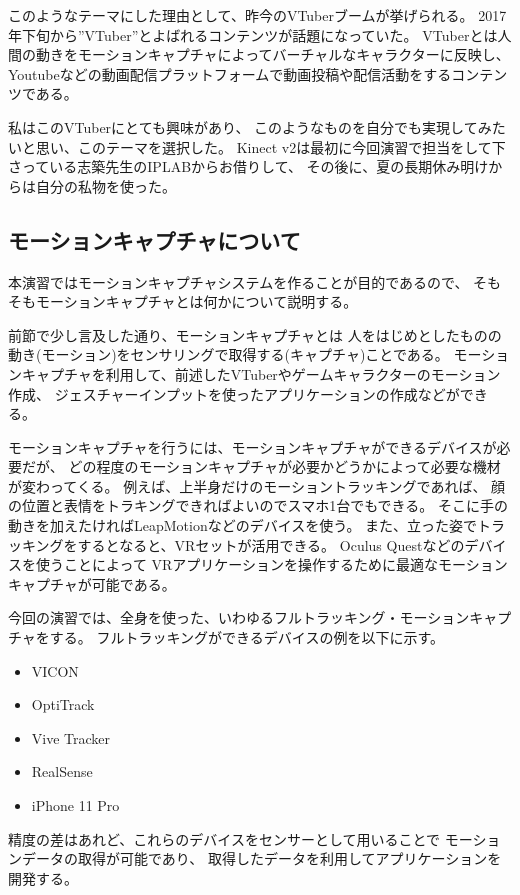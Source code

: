 \documentclass[a4j]{jsarticle}
\begin{document}
このようなテーマにした理由として、昨今のVTuberブームが挙げられる。
2017年下旬から”VTuber”とよばれるコンテンツが話題になっていた。
VTuberとは人間の動きをモーションキャプチャによってバーチャルなキャラクターに反映し、
Youtubeなどの動画配信プラットフォームで動画投稿や配信活動をするコンテンツである。

私はこのVTuberにとても興味があり、
このようなものを自分でも実現してみたいと思い、このテーマを選択した。
Kinect v2は最初に今回演習で担当をして下さっている志築先生のIPLABからお借りして、
その後に、夏の長期休み明けからは自分の私物を使った。

\subsection{モーションキャプチャについて}

本演習ではモーションキャプチャシステムを作ることが目的であるので、
そもそもモーションキャプチャとは何かについて説明する。

前節で少し言及した通り、モーションキャプチャとは
人をはじめとしたものの動き(モーション)をセンサリングで取得する(キャプチャ)ことである。
モーションキャプチャを利用して、前述したVTuberやゲームキャラクターのモーション作成、
ジェスチャーインプットを使ったアプリケーションの作成などができる。

モーションキャプチャを行うには、モーションキャプチャができるデバイスが必要だが、
どの程度のモーションキャプチャが必要かどうかによって必要な機材が変わってくる。
例えば、上半身だけのモーショントラッキングであれば、
顔の位置と表情をトラキングできればよいのでスマホ1台でもできる。
そこに手の動きを加えたければLeapMotionなどのデバイスを使う。
また、立った姿でトラッキングをするとなると、VRセットが活用できる。
Oculus Questなどのデバイスを使うことによって
VRアプリケーションを操作するために最適なモーションキャプチャが可能である。

今回の演習では、全身を使った、いわゆるフルトラッキング・モーションキャプチャをする。
フルトラッキングができるデバイスの例を以下に示す。

\begin{itemize}
  \item VICON
  \item OptiTrack
  \item Vive Tracker
  \item RealSense
  \item iPhone 11 Pro
\end{itemize}

精度の差はあれど、これらのデバイスをセンサーとして用いることで
モーションデータの取得が可能であり、
取得したデータを利用してアプリケーションを開発する。
\end{document}
